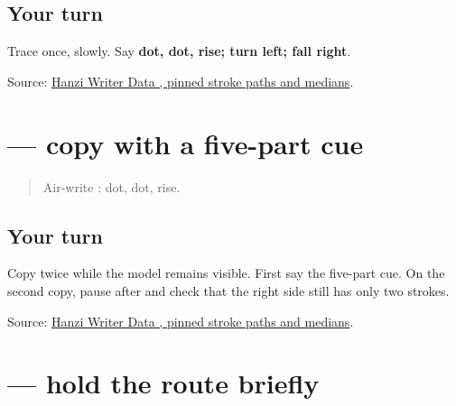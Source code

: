 \subsection*{Your turn}
Trace \textbf{} once, slowly. Say \textbf{dot, dot, rise; turn left; fall right}.

\begin{tcolorbox}[breakable,colback=teal!4,colframe=teal!35!black,title={Before you move on}]
Source: \href{https://raw.githubusercontent.com/chanind/hanzi-writer-data/68d10a4b21150cae5e1ebbd223eed289cf32d90c/data/\%E6\%B1\%89.json}{Hanzi Writer Data , pinned stroke paths and medians}.
\end{tcolorbox}
\section[\texorpdfstring{\zh{汉} (hàn)}{汉 (hàn)}]{ — copy with a five-part cue}

\label{lesson:ZH-W16-han-guided}



\begin{quote}
Air-write : dot, dot, rise.
\end{quote}

\subsection*{Your turn}

Copy \textbf{} twice while the model remains visible. First say the five-part cue. On the second copy, pause after  and check that the right side still has only two strokes.

\begin{tcolorbox}[breakable,colback=teal!4,colframe=teal!35!black,title={Before you move on}]
Source: \href{https://raw.githubusercontent.com/chanind/hanzi-writer-data/68d10a4b21150cae5e1ebbd223eed289cf32d90c/data/\%E6\%B1\%89.json}{Hanzi Writer Data , pinned stroke paths and medians}.
\end{tcolorbox}
\section[\texorpdfstring{\zh{汉} (hàn)}{汉 (hàn)}]{ — hold the route briefly}

\label{lesson:ZH-W16-han-delayed}




